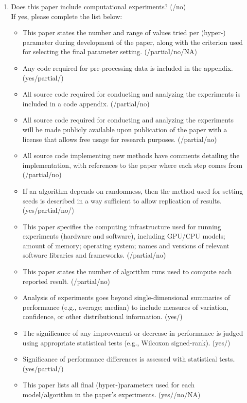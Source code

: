 \begin{enumerate}
    \item Does this paper include computational experiments? (/no) \\
    If yes, please complete the list below:
    \begin{itemize}
        \item This paper states the number and range of values tried per (hyper-) parameter during development of the paper, along with the criterion used for selecting the final parameter setting. (/partial/no/NA)
        \item Any code required for pre-processing data is included in the appendix. (yes/partial/)
        \item All source code required for conducting and analyzing the experiments is included in a code appendix. (/partial/no)
        \item All source code required for conducting and analyzing the experiments will be made publicly available upon publication of the paper with a license that allows free usage for research purposes. (/partial/no)
        \item All source code implementing new methods have comments detailing the implementation, with references to the paper where each step comes from (/partial/no)
        \item If an algorithm depends on randomness, then the method used for setting seeds is described in a way sufficient to allow replication of results. (yes/partial/no/)
        \item This paper specifies the computing infrastructure used for running experiments (hardware and software), including GPU/CPU models; amount of memory; operating system; names and versions of relevant software libraries and frameworks. (/partial/no)
        \item This paper states the number of algorithm runs used to compute each reported result. (/partial/no)
        \item Analysis of experiments goes beyond single-dimensional summaries of performance (e.g., average; median) to include measures of variation, confidence, or other distributional information. (yes/)
        \item The significance of any improvement or decrease in performance is judged using appropriate statistical tests (e.g., Wilcoxon signed-rank). (yes/)
        \item Significance of performance differences is assessed with statistical tests. (yes/partial/)
        \item This paper lists all final (hyper-)parameters used for each model/algorithm in the paper’s experiments. (yes//no/NA)
    \end{itemize}
\end{enumerate}



